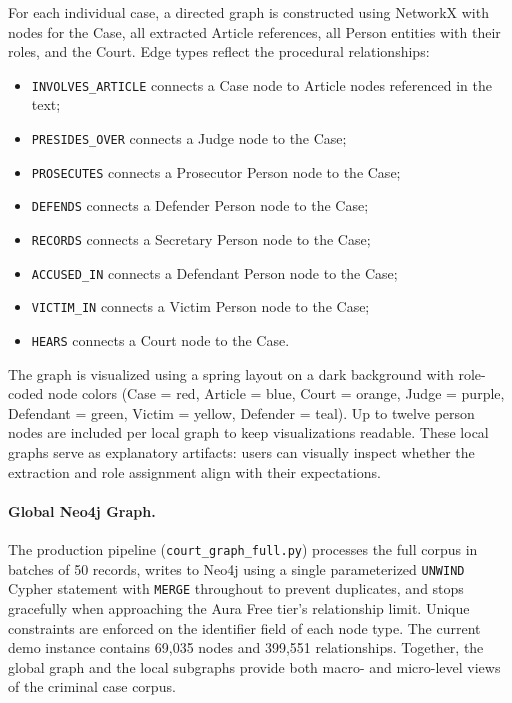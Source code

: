 \documentclass[11pt]{article}
\begin{document}
For each individual case, a directed graph is constructed using NetworkX with nodes for the Case, all extracted Article references, all Person entities with their roles, and the Court. Edge types reflect the procedural relationships:
\begin{itemize}
\item \texttt{INVOLVES\_ARTICLE} connects a Case node to Article nodes referenced in the text;
\item \texttt{PRESIDES\_OVER} connects a Judge node to the Case;
\item \texttt{PROSECUTES} connects a Prosecutor Person node to the Case;
\item \texttt{DEFENDS} connects a Defender Person node to the Case;
\item \texttt{RECORDS} connects a Secretary Person node to the Case;
\item \texttt{ACCUSED\_IN} connects a Defendant Person node to the Case;
\item \texttt{VICTIM\_IN} connects a Victim Person node to the Case;
\item \texttt{HEARS} connects a Court node to the Case.
\end{itemize}

The graph is visualized using a spring layout on a dark background with role-coded node colors (Case = red, Article = blue, Court = orange, Judge = purple, Defendant = green, Victim = yellow, Defender = teal). Up to twelve person nodes are included per local graph to keep visualizations readable. These local graphs serve as explanatory artifacts: users can visually inspect whether the extraction and role assignment align with their expectations.

\paragraph{Global Neo4j Graph.}

The production pipeline (\texttt{court\_graph\_full.py}) processes the full corpus in batches of 50 records, writes to Neo4j using a single parameterized \texttt{UNWIND} Cypher statement with \texttt{MERGE} throughout to prevent duplicates, and stops gracefully when approaching the Aura Free tier's relationship limit. Unique constraints are enforced on the identifier field of each node type. The current demo instance contains 69{,}035 nodes and 399{,}551 relationships. Together, the global graph and the local subgraphs provide both macro- and micro-level views of the criminal case corpus.
\end{document}
